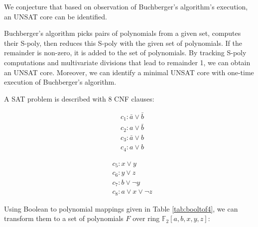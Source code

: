 We  conjecture that based on observation of Buchberger's algorithm's execution, an UNSAT core can be identified.
\begin{Proposition}
Buchberger's algorithm picks pairs of polynomials from a given set, computes their S-poly, then reduces this S-poly
with the given set of polynomials. If the remainder is non-zero,
it is added to the set of polynomials.
By tracking S-poly computations and multivariate divisions that lead to remainder 
1, we can obtain an UNSAT core. Moreover, we can identify a minimal UNSAT core with one-time
 execution of Buchberger's algorithm.
\end{Proposition}
\begin{Example}
A SAT problem is described with 8 CNF clauses:

\begin{minipage}[h]{0.3\textwidth}
\begin{align*}
&c_1: \bar{a}\lor\bar{b}\\
&c_2: a\lor\bar{b}\\
&c_3: \bar{a}\lor b\\
&c_4: a\lor b
\end{align*}
\end{minipage}
\begin{minipage}[h]{0.7\textwidth}
\begin{align*}
&c_5: x\lor y\\
&c_6: y\lor z\\
&c_7: b\lor \neg y\\
&c_8: a\lor x\lor \neg z
\end{align*}
\end{minipage}

Using Boolean to polynomial mappings given in Table \ref{tab:booltof4}, we can transform them to a set of
polynomials $F$ over ring $\mathbb F_2[a,b,x,y,z]$:


\end{Example}
